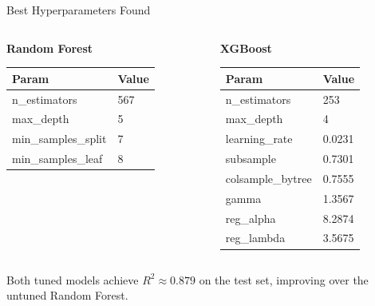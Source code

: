 \documentclass[10pt]{beamer}
\begin{document}
\begin{frame}{Best Hyperparameters Found}
\small
\begin{columns}
\begin{column}{0.48\textwidth}
\textbf{Random Forest}
\begin{table}[h]
\centering
\begin{tabular}{@{}ll@{}}
\toprule
Param & Value \\
\midrule
n\_estimators & 567 \\
max\_depth & 5 \\
min\_samples\_split & 7 \\
min\_samples\_leaf & 8 \\
\bottomrule
\end{tabular}
\end{table}
\end{column}
\begin{column}{0.52\textwidth}
\textbf{XGBoost}
\begin{table}[h]
\centering
\begin{tabular}{@{}ll@{}}
\toprule
Param & Value \\
\midrule
n\_estimators & 253 \\
max\_depth & 4 \\
learning\_rate & 0.0231 \\
subsample & 0.7301 \\
colsample\_bytree & 0.7555 \\
gamma & 1.3567 \\
reg\_alpha & 8.2874 \\
reg\_lambda & 3.5675 \\
\bottomrule
\end{tabular}
\end{table}
\end{column}
\end{columns}
\vspace{2pt}
Both tuned models achieve $R^2 \approx 0.879$ on the test set, improving over the untuned Random Forest.
\end{frame}
\end{document}
